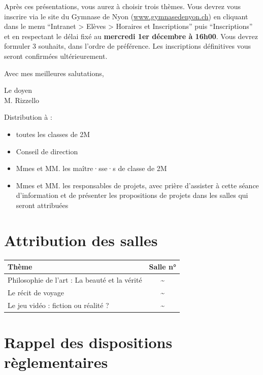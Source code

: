\documentclass[
  10pt,
  french,
  a5paper,
  openany]{book}
\providecommand{\tightlist}{%
  \setlength{\itemsep}{0pt}\setlength{\parskip}{0pt}}
\newenvironment{signature}{\begin{flushright}}{\end{flushright}}
\begin{document}
\clearpage

Après ces présentations, vous aurez à choisir trois thèmes. Vous devrez vous inscrire via le site du Gymnase de Nyon (\url{www.gymnasedenyon.ch}) en cliquant dans le menu ``Intranet \textgreater{} Elèves \textgreater{} Horaires et Inscriptions'' puis ``Inscriptions'' et en respectant le délai fixé au \textbf{mercredi 1er décembre à 16h00}. Vous devrez formuler 3 souhaits, dans l'ordre de préférence. Les inscriptions définitives vous seront confirmées ultérieurement.

Avec mes meilleures salutations,

\begin{signature}
Le doyen\\
M. Rizzello

\end{signature}


Distribution à :

\begin{itemize}
\tightlist
\item
  toutes les classes de 2M
\item
  Conseil de direction
\item
  Mmes et MM. les maître·sse·s de classe de 2M
\item
  Mmes et MM. les responsables de projets, avec prière d'assister à cette séance d'information et de présenter les propositions de projets dans les salles qui seront attribuées
\end{itemize}

\hypertarget{attribution-des-salles}{%
\chapter*{Attribution des salles}\label{attribution-des-salles}}

\begin{longtable}[]{@{}lc@{}}
\toprule
Thème & Salle n°\tabularnewline
\midrule
\endhead
Philosophie de l'art : La beauté et la vérité & \textasciitilde{}\tabularnewline
Le récit de voyage & \textasciitilde{}\tabularnewline
Le jeu vidéo : fiction ou réalité ? & \textasciitilde{}\tabularnewline
\bottomrule
\end{longtable}

\hypertarget{rappel-des-dispositions-ruxe8glementaires}{%
\chapter*{Rappel des dispositions règlementaires}\label{rappel-des-dispositions-ruxe8glementaires}}
\end{document}
